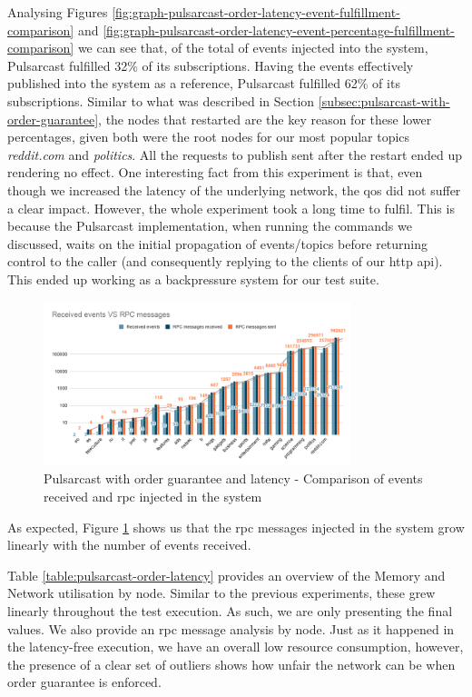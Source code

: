 Analysing Figures
\ref{fig:graph-pulsarcast-order-latency-event-fulfillment-comparison} and
\ref{fig:graph-pulsarcast-order-latency-event-percentage-fulfillment-comparison}
we can see that, of the total of events injected into the system, Pulsarcast
fulfilled 32\% of its subscriptions. Having the events effectively published
into the system as a reference, Pulsarcast fulfilled 62\% of its subscriptions.
Similar to what was described in Section
\ref{subsec:pulsarcast-with-order-guarantee}, the nodes that restarted are the
key reason for these lower percentages, given both were the root nodes for our
most popular topics \emph{reddit.com} and \emph{politics}. All the requests to
publish sent after the restart ended up rendering no effect. One interesting
fact from this experiment is that, even though we increased the latency of the
underlying network, the \acrshort{qos} did not suffer a clear impact.  However,
the whole experiment took a long time to fulfil. This is because the Pulsarcast
implementation, when running the commands we discussed, waits on the initial
propagation of events/topics before returning control to the caller (and
consequently replying to the clients of our \acrshort{http} \acrshort{api}).
This ended up working as a backpressure system for our test suite.

\begin{figure}[!htb]
  \centering
  \includegraphics[width=0.8\textwidth]{../images/graph-pulsarcast-order-latency-rpc.png}
  \caption{Pulsarcast with order guarantee and latency - Comparison of events received and \acrshort{rpc} injected in the system}
  \label{fig:graph-pulsarcast-order-latency-rpc}
\end{figure}


As expected, Figure \ref{fig:graph-pulsarcast-order-latency-rpc} shows us that
the \acrshort{rpc} messages injected in the system grow linearly with the number of events
received.

Table \ref{table:pulsarcast-order-latency} provides an overview of the Memory
and Network utilisation by node. Similar to the previous experiments, these
grew linearly throughout the test execution. As such, we are only presenting
the final values. We also provide an \acrshort{rpc} message analysis by node. Just as it
happened in the latency-free execution, we have an overall low resource
consumption, however, the presence of a clear set of outliers shows how unfair
the network can be when order guarantee is enforced.


